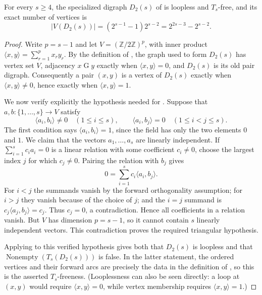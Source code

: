\begin{lemma}
For every $s\geq4$, the specialized digraph $D_2(s)$ of
 is loopless and $T_s$-free, and its exact number of
vertices is
\[
 |V(D_2(s))|=(2^{s-1}-1)2^{s-2}
 =2^{2s-3}-2^{s-2}.
\]
\end{lemma}
\begin{proof}
Write $p=s-1$ and let $V=(\mathbb Z/2\mathbb Z)^p$, with inner product
$\langle x,y\rangle=\sum_{r=1}^p x_r y_r$.  By the definition of
, the graph used to form $D_2(s)$ has vertex set
$V$, adjacency $x\mathrel{G}y$ exactly when $\langle x,y\rangle=0$, and
$D_2(s)$ is its old pair digraph.  Consequently a pair $(x,y)$ is a
vertex of $D_2(s)$ exactly when $\langle x,y\rangle\ne0$, hence exactly
when $\langle x,y\rangle=1$.

We now verify explicitly the hypothesis needed for
.  Suppose that
$a,b:\{1,\ldots,s\}\to V$ satisfy
\[
 \langle a_i,b_i\rangle\ne0\quad(1\leq i\leq s),
 \qquad \langle a_i,b_j\rangle=0\quad(1\leq i<j\leq s).
\]
The first condition says $\langle a_i,b_i\rangle=1$, since the field has
only the two elements $0$ and $1$.  We claim that the vectors
$a_1,\ldots,a_s$ are linearly independent.  If
$\sum_{i=1}^s c_i a_i=0$ is a linear relation with some coefficient
$c_i\ne0$, choose the largest index $j$ for which $c_j\ne0$.  Pairing the
relation with $b_j$ gives
\[
 0=\sum_{i=1}^s c_i\langle a_i,b_j\rangle.
\]
For $i<j$ the summands vanish by the forward orthogonality assumption;
for $i>j$ they vanish because of the choice of $j$; and the $i=j$
summand is $c_j\langle a_j,b_j\rangle=c_j$.  Thus $c_j=0$, a
contradiction.  Hence all coefficients in a relation vanish.  But $V$
has dimension $p=s-1$, so it cannot contain $s$ linearly independent
vectors.  This contradiction proves the required triangular hypothesis.

Applying  to this verified hypothesis
gives both that $D_2(s)$ is loopless and that
$\operatorname{Nonempty}(T_s(D_2(s)))$ is false.  In the latter statement,
the ordered vertices and their forward arcs are precisely the data in the
definition of , so this is the asserted
$T_s$-freeness.  (Looplessness can also be seen directly: a loop at
$(x,y)$ would require $\langle x,y\rangle=0$, while vertex membership
requires $\langle x,y\rangle=1$.)


\end{proof}
